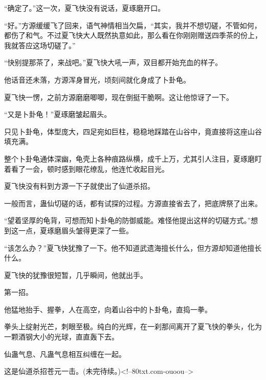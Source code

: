 \begin{this_body}
“确定了。”这一次，夏飞快没有说话，夏琢磨开口。

“好。”方源缓缓飞了回来，语气神情相当欠扁，“其实，我并不想切磋，不管如何，都伤了和气。不过夏飞快大人既然执意如此，那么看在你刚刚赠送四季茶的份上，我就答应这场切磋了。”

“快别提那茶了，来战吧。”夏飞快大吼一声，双目都开始充血的样子。

他话音还未落，方源浑身冒光，顷刻间就化身成了卜卦龟。

夏飞快一愣，之前方源磨磨唧唧，现在倒挺干脆啊。这让他惊讶了一下。

“又是卜卦龟！”夏琢磨皱起眉头。

只见卜卦龟，体型庞大，四足宛如巨柱，稳稳地踩踏在山谷中，竟直接将这座山谷填充满。

整个卜卦龟通体深幽，龟壳上各种痕路纵横，成千上万，尤其引人注目，夏琢磨盯着看了一会，顿时感到眼花缭乱，他连忙收起目光。

夏飞快没有料到方源一下子就使出了仙道杀招。

一般而言，蛊仙切磋的话，都有试探的过程。方源直接省去了，把底牌祭了出来。

“望着坚厚的龟背，可想而知卜卦龟的防御威能。难怪他提出这样的切磋方式。”想到这一点，夏琢磨眉头皱得更深了一些。

“该怎么办？”夏飞快犹豫了一下。他不知道武遗海擅长什么，但方源却知道他擅长什么。

夏飞快的犹豫很短暂，几乎瞬间，他就出手。

第一招。

他猛地抬手、握拳，人在高空，向着山谷中的卜卦龟，直捣一拳。

拳头上绽射光芒，刺眼至极。纯白的光辉，在一刹那间离开了夏飞快的拳头，化为一颗酒钢大小的光球，直直轰下去。

仙蛊气息、凡蛊气息相互纠缠在一起。

这是仙道杀招苍元一击。(未完待续。)<!--80txt.com-ouoou-->

\end{this_body}

